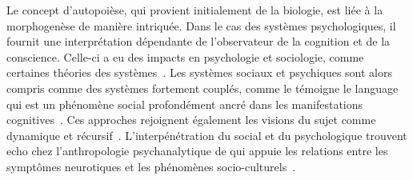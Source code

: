 {%
}{
Le concept d'autopoièse, qui provient initialement de la biologie, est liée à la morphogenèse de manière intriquée. Dans le cas des systèmes psychologiques, il fournit une interprétation dépendante de l'observateur de la cognition et de la conscience. Celle-ci a eu des impacts en psychologie et sociologie, comme certaines théories des systèmes~\cite{gershenson_requisite_2014}. Les systèmes sociaux et psychiques sont alors compris comme des systèmes fortement couplés, comme le témoigne le language qui est un phénomène social profondément ancré dans les manifestations cognitives~\cite{seidl_luhmanns_2004}. Ces approches rejoignent également les visions du sujet comme dynamique et récursif~\cite{pichon_riviere_processus_2004}. L'interpénétration du social et du psychologique trouvent echo chez l'anthropologie psychanalytique de  qui appuie les relations entre les symptômes neurotiques et les phénomènes socio-culturels~\cite{freud_totem_1989}.
}




